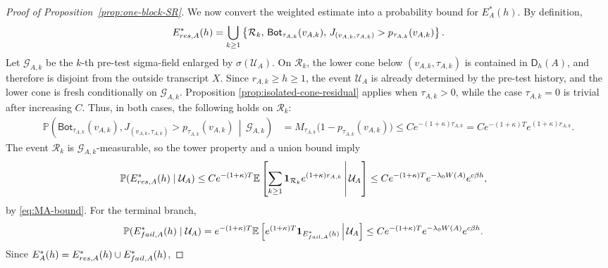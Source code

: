 \documentclass[10pt,a4paper]{amsart}
\begin{document}
\begin{proof}[Proof of Proposition~\ref{prop:one-block-SR}]
We now convert the weighted estimate into a probability bound for
\(E_A^*(h)\). By definition,
\[
        E_{{\rm res},A}^*(h)
        =
        \bigcup_{k\ge1}
        \left\{
            \mathcal R_k,\,
            \mathsf{Bot}_{\tau_{A,k}}(v_{A,k}),\,
            J_{(v_{A,k},\tau_{A,k})}>p_{\tau_{A,k}}(v_{A,k})
        \right\}.
\]
Let \(\mathcal G_{A,k}\) be the \(k\)-th pre-test sigma-field enlarged
by \(\sigma(\mathcal U_A)\). On \(\mathcal R_k\), the lower cone below
\((v_{A,k},\tau_{A,k})\) is contained in \(\mathsf D_h(A)\), and
therefore is disjoint from the outside transcript \(X\). Since
\(r_{A,k}\ge h\ge1\), the event \(\mathcal U_A\) is already
determined by the pre-test history, and the lower cone is fresh conditionally
on \(\mathcal G_{A,k}\). Proposition \ref{prop:isolated-cone-residual}
applies when \(\tau_{A,k}>0\), while the case \(\tau_{A,k}=0\) is trivial after
increasing \(C\). Thus, in both cases, the following holds on \(\mathcal R_k\):
\[
\begin{aligned}
        \mathbb P
        \left(
            \mathsf{Bot}_{\tau_{A,k}}(v_{A,k}),
            J_{(v_{A,k},\tau_{A,k})}>p_{\tau_{A,k}}(v_{A,k})
            \,\middle|\,
            \mathcal G_{A,k}
        \right)
        &=
        M_{\tau_{A,k}}\bigl(1-p_{\tau_{A,k}}(v_{A,k})\bigr)
        \le
        C e^{-(1+\kappa)\tau_{A,k}}     
        =
        C e^{-(1+\kappa) T}e^{(1+\kappa)r_{A,k}} .
\end{aligned}
\]
The event \(\mathcal R_k\) is \(\mathcal G_{A,k}\)-measurable, so the
tower property and a union bound imply
\[
\begin{aligned}
        \mathbb P(E_{{\rm res},A}^*(h)\mid\mathcal U_A)
        &\le
        C e^{-(1+\kappa) T}
        \mathbb E
        \left[
            \sum_{k\ge1}
            \mathbf 1_{\mathcal R_k}
            e^{(1+\kappa)r_{A,k}}
            \,\middle|\,
            \mathcal U_A
        \right]
        \le
        C e^{-(1+\kappa) T}
        e^{-\lambda_0W(A)}e^{c\beta h},
\end{aligned}
\]
by \eqref{eq:MA-bound}.
For the terminal branch,
\[
\begin{aligned}
        \mathbb P(E_{{\rm fail},A}^*(h)\mid\mathcal U_A)
        &=
        e^{-(1+\kappa) T}
        \mathbb E
        \left[
            e^{(1+\kappa) T}
            \mathbf 1_{E_{{\rm fail},A}^*(h)}
            \,\middle|\,
            \mathcal U_A
        \right]  \le
        C e^{-(1+\kappa) T}
        e^{-\lambda_0W(A)}e^{c\beta h}.
\end{aligned}
\]
Since \(E_A^*(h)=E_{{\rm res},A}^*(h)\cup E_{{\rm fail},A}^*(h)\),

\end{proof}
\end{document}
